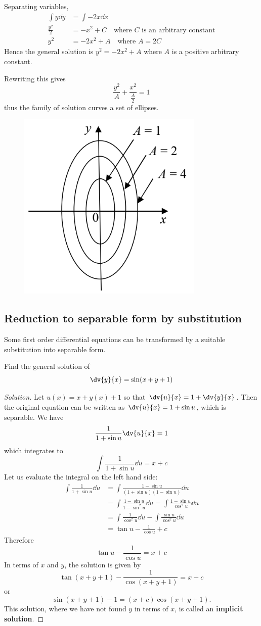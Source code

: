 \begin{solution}
Separating variables,
\begin{align*}
\int y\dd{y}&=\int-2x\dd{x}\\
\frac{y^2}{2}&=-x^2+C\quad\text{where $C$ is an arbitrary constant}\\
y^2&=-2x^2+A\quad\text{where $A=2C$}
\end{align*}
Hence the general solution is $y^2=-2x^2+A$ where $A$ is a positive arbitrary constant.

Rewriting this gives 
\[ \frac{y^2}{A}+\frac{x^2}{\frac{A}{2}}=1 \]
thus the family of solution curves a set of ellipses.

\begin{figure}[H]
    \centering
    \includegraphics[width=0.3\linewidth]{images/family-soln.png}
\end{figure}
\end{solution}

\subsection{Reduction to separable form by substitution}
Some first order differential equations can be transformed by a suitable substitution into separable form.

\begin{exercise}
Find the general solution of
\[ \dv{y}{x} = \sin(x+y+1) \]
\end{exercise}

\begin{proof}[Solution]
Let $u(x) = x + y(x) + 1$ so that $\dv{u}{x} = 1 + \dv{y}{x}$. Then the original equation can be written as $\dv{u}{x} = 1 + \sin u$, which is separable. We have
\[ \frac{1}{1+\sin u}\dv{u}{x} = 1 \]
which integrates to
\[ \int \frac{1}{1+\sin u} \dd{u} = x+c \]
Let us evaluate the integral on the left hand side:
\begin{align*}
\int \frac{1}{1+\sin u} \dd{u}
&= \int \frac{1-\sin u}{(1+\sin u)(1-\sin u)} \dd{u} \\
&= \int \frac{1-\sin u}{1-\sin^2u} \dd{u} = \int \frac{1-\sin u}{\cos^2u} \dd{u} \\
&= \int \frac{1}{\cos^2u} \dd{u} - \int \frac{\sin u}{\cos^2u} \dd{u} \\
&= \tan u - \frac{1}{\cos u} + c
\end{align*}
Therefore 
\[ \tan u - \frac{1}{\cos u} = x+c \]
In terms of $x$ and $y$, the solution is given by
\[ \tan (x+y+1) - \frac{1}{\cos (x+y+1)} = x+c \]
or
\[ \sin (x+y+1) - 1 = (x+c) \cos (x+y+1). \]
This solution, where we have not found $y$ in terms of $x$, is called an \textbf{implicit solution}.
\end{proof}

